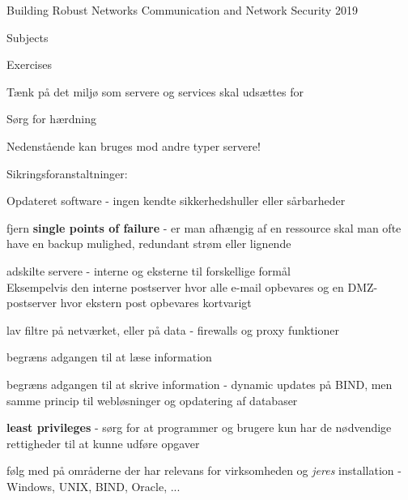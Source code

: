 \documentclass[Screen16to9,17pt]{foils}
\begin{document}
\mytitlepage
{Building Robust Networks}
{Communication and Network Security 2019}



\begin{list1}
\item Subjects
\begin{list2}
\item
\end{list2}
\item Exercises
\begin{list2}
\item
\end{list2}
\end{list1}



\begin{list1}
\item Tænk på det miljø som servere og services skal udsættes for
\item Sørg for hærdning
\end{list1}

\begin{list1}
  \item Nedenstående kan bruges mod andre typer servere!
\item Sikringsforanstaltninger:
  \begin{list2}
  \item Opdateret software - ingen kendte sikkerhedshuller eller
  sårbarheder
\item fjern {\bfseries single points of failure} - er man afhængig af
  en ressource skal man ofte have en backup mulighed, redundant strøm
  eller lignende
\item adskilte servere - interne og eksterne til forskellige formål\\
Eksempelvis den interne postserver hvor alle e-mail opbevares og en
DMZ-postserver hvor ekstern post opbevares kortvarigt
\item lav filtre på netværket, eller på data - firewalls og proxy
  funktioner
\item begræns adgangen til at læse information
\item begræns adgangen til at skrive information - dynamic updates på
  BIND, men samme princip til webløsninger og opdatering af databaser
\item {\bfseries least privileges} - sørg for at programmer og brugere
  kun har de nødvendige rettigheder til at kunne udføre opgaver
\item følg med på områderne der har relevans for virksomheden og
  \emph{jeres} installation - Windows, UNIX, BIND, Oracle, ...
  \end{list2}
\end{list1}
\end{document}
